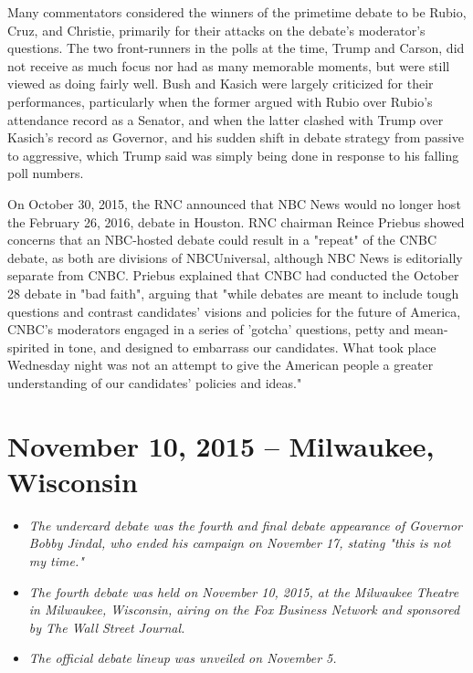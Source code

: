 Many commentators considered the winners of the primetime debate to be
Rubio, Cruz, and Christie, primarily for their attacks on the debate's
moderator's questions. The two front-runners in the polls at the time,
Trump and Carson, did not receive as much focus nor had as many
memorable moments, but were still viewed as doing fairly well. Bush and
Kasich were largely criticized for their performances, particularly when
the former argued with Rubio over Rubio's attendance record as a
Senator, and when the latter clashed with Trump over Kasich's record as
Governor, and his sudden shift in debate strategy from passive to
aggressive, which Trump said was simply being done in response to his
falling poll numbers.

On October 30, 2015, the RNC announced that NBC News would no longer
host the February 26, 2016, debate in Houston. RNC chairman Reince
Priebus showed concerns that an NBC-hosted debate could result in a
"repeat" of the CNBC debate, as both are divisions of NBCUniversal,
although NBC News is editorially separate from CNBC. Priebus explained
that CNBC had conducted the October 28 debate in "bad faith", arguing
that "while debates are meant to include tough questions and contrast
candidates' visions and policies for the future of America, CNBC's
moderators engaged in a series of 'gotcha' questions, petty and
mean-spirited in tone, and designed to embarrass our candidates. What
took place Wednesday night was not an attempt to give the American
people a greater understanding of our candidates' policies and ideas."

\section{November 10, 2015 -- Milwaukee,
Wisconsin}\label{november-10-2015-milwaukee-wisconsin}

\begin{itemize}
\item
  \emph{The undercard debate was the fourth and final debate appearance
  of Governor Bobby Jindal, who ended his campaign on November 17,
  stating "this is not my time."}
\item
  \emph{The fourth debate was held on November 10, 2015, at the
  Milwaukee Theatre in Milwaukee, Wisconsin, airing on the Fox Business
  Network and sponsored by The Wall Street Journal.}
\item
  \emph{The official debate lineup was unveiled on November 5.}
\end{itemize}

